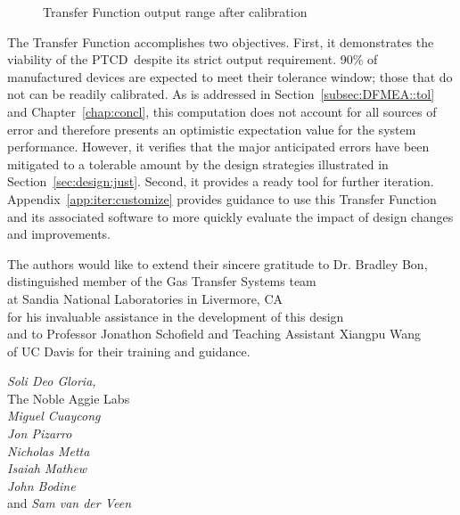 \documentclass[12pt, letterpaper]{report}%
\newcounter{mycounter}           %
\newcounter{sub}[mycounter]      %
\newcommand{\device}{PTCD}
\begin{document}
\begin{appendices}
\begin{figure}[H]
%
					\caption{Transfer Function output range after calibration}
					\label{fig:TF_cal}
			\end{figure}

			The Transfer Function accomplishes two objectives. First, it demonstrates the viability of the \device\ despite its strict output requirement. 90\% of manufactured devices are expected to meet their
			tolerance window; those that do not can be readily calibrated. As is addressed in Section~\ref{subsec:DFMEA::tol} and Chapter~\ref{chap:concl}, this computation does not account for all sources of error and therefore presents an optimistic
			expectation value for the system performance. However, it verifies that the major anticipated errors have been mitigated to a tolerable amount by the design strategies illustrated in Section~\ref{sec:design:just}.
			Second, it provides a ready tool for further iteration. Appendix~\ref{app:iter:customize} provides guidance to use this Transfer Function and its associated software to more quickly evaluate the impact of design changes and improvements.  

	\newpage

	\vspace*{.1\textheight}

	\begin{center}

		The authors would like to extend their sincere gratitude to
		Dr. Bradley Bon,\\
		distinguished member of the Gas Transfer Systems team\\
		at Sandia National Laboratories in Livermore, CA\\
		for his invaluable assistance in the development of this design\\[6pt]
		and to Professor Jonathon Schofield and Teaching Assistant Xiangpu Wang\\
		of UC Davis
		for their training and guidance.

		\vspace*{.05\textheight}

		\textit{Soli Deo Gloria,}\\
		The Noble Aggie Labs\\[24pt]

		\textit{Miguel Cuaycong}\\
		\textit{Jon Pizarro}\\
		\textit{Nicholas Metta}\\
		\textit{Isaiah Mathew}\\
		\textit{John Bodine}\\
		and \textit{Sam van der Veen}

	\end{center}

\end{appendices}
\end{document}
